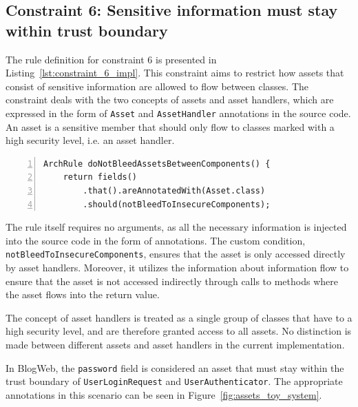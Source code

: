 \subsection{Constraint 6: Sensitive information must stay within trust boundary}
The rule definition for constraint 6 is presented in Listing~\ref{lst:constraint_6_impl}.
This constraint aims to restrict how assets that consist of sensitive information are allowed to flow between classes. The constraint deals with the two concepts of assets and asset handlers, which are expressed in the form of \texttt{Asset} and \texttt{AssetHandler} annotations in the source code. An asset is a sensitive member that should only flow to classes marked with a high security level, i.e. an asset handler.

\begin{minipage}{\linewidth}
\begin{lstlisting}[caption={Rule definition for constraint 6.}, captionpos=b, label=lst:constraint_6_impl, numbers=left]
ArchRule doNotBleedAssetsBetweenComponents() {
    return fields()
        .that().areAnnotatedWith(Asset.class)
        .should(notBleedToInsecureComponents);
\end{lstlisting}
\end{minipage}

The rule itself requires no arguments, as all the necessary information is injected into the source code in the form of annotations. The custom condition, \texttt{notBleedTo\-InsecureComponents}, ensures that the asset is only accessed directly by asset handlers. Moreover, it utilizes the information about information flow to ensure that the asset is not accessed indirectly through calls to methods where the asset flows into the return value.

The concept of asset handlers is treated as a single group of classes that have to a high security level, and are therefore granted access to all assets. No distinction is made between different assets and asset handlers in the current implementation.

In BlogWeb, the \texttt{password} field is considered an asset that must stay within the trust boundary of \texttt{UserLoginRequest} and \texttt{UserAuthenticator}. The appropriate annotations in this scenario can be seen in Figure~\ref{fig:assets_toy_system}.

